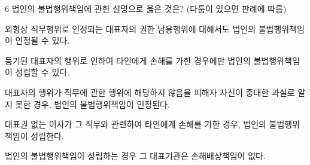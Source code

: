 \begin{question}{6}
법인의 불법행위책임에 관한 설명으로 옳은 것은? (다툼이 있으면 판례에 따름)
\begin{choices}
  \item 외형상 직무행위로 인정되는 대표자의 권한 남용행위에 대해서도 법인의 불법행위책임이 인정될 수 있다.
  \item 등기된 대표자의 행위로 인하여 타인에게 손해를 가한 경우에만 법인의 불법행위책임이 성립할 수 있다.
  \item 대표자의 행위가 직무에 관한 행위에 해당하지 않음을 피해자 자신이 중대한 과실로 알지 못한 경우, 법인의 불법행위책임이 인정된다.
  \item 대표권 없는 이사가 그 직무와 관련하여 타인에게 손해를 가한 경우, 법인의 불법행위책임이 성립한다.
  \item 법인의 불법행위책임이 성립하는 경우 그 대표기관은 손해배상책임이 없다.
\end{choices}
\end{question}
